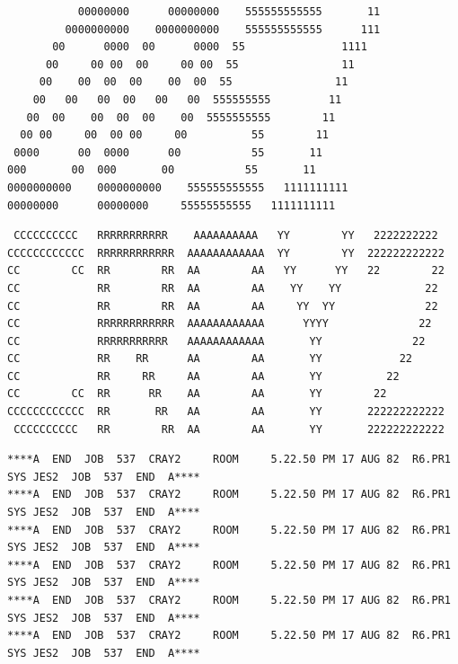 \begin{verbatim}
           00000000      00000000    555555555555       11
         0000000000    0000000000    555555555555      111
       00      0000  00      0000  55               1111
      00     00 00  00     00 00  55                11
     00    00  00  00    00  00  55                11
    00   00   00  00   00   00  555555555         11
   00  00    00  00  00    00  5555555555        11
  00 00     00  00 00     00          55        11
 0000      00  0000      00           55       11
000       00  000       00           55       11
0000000000    0000000000    555555555555   1111111111
00000000      00000000     55555555555   1111111111
\end{verbatim}
\begin{verbatim}
 CCCCCCCCCC   RRRRRRRRRRR    AAAAAAAAAA   YY        YY   2222222222
CCCCCCCCCCCC  RRRRRRRRRRRR  AAAAAAAAAAAA  YY        YY  222222222222
CC        CC  RR        RR  AA        AA   YY      YY   22        22
CC            RR        RR  AA        AA    YY    YY             22
CC            RR        RR  AA        AA     YY  YY              22
CC            RRRRRRRRRRRR  AAAAAAAAAAAA      YYYY              22
CC            RRRRRRRRRRR   AAAAAAAAAAAA       YY              22
CC            RR    RR      AA        AA       YY            22
CC            RR     RR     AA        AA       YY          22
CC        CC  RR      RR    AA        AA       YY        22
CCCCCCCCCCCC  RR       RR   AA        AA       YY       222222222222
 CCCCCCCCCC   RR        RR  AA        AA       YY       222222222222
\end{verbatim}
\begin{verbatim}
****A  END  JOB  537  CRAY2     ROOM     5.22.50 PM 17 AUG 82  R6.PR1  SYS JES2  JOB  537  END  A****
****A  END  JOB  537  CRAY2     ROOM     5.22.50 PM 17 AUG 82  R6.PR1  SYS JES2  JOB  537  END  A****
****A  END  JOB  537  CRAY2     ROOM     5.22.50 PM 17 AUG 82  R6.PR1  SYS JES2  JOB  537  END  A****
****A  END  JOB  537  CRAY2     ROOM     5.22.50 PM 17 AUG 82  R6.PR1  SYS JES2  JOB  537  END  A****
****A  END  JOB  537  CRAY2     ROOM     5.22.50 PM 17 AUG 82  R6.PR1  SYS JES2  JOB  537  END  A****
****A  END  JOB  537  CRAY2     ROOM     5.22.50 PM 17 AUG 82  R6.PR1  SYS JES2  JOB  537  END  A****
\end{verbatim}
